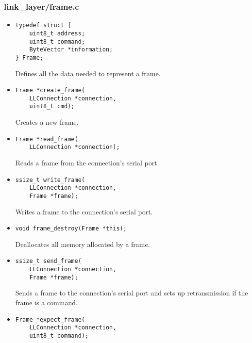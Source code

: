 \documentclass[11pt,a4paper,twocolumn]{article}
\begin{document}
\subsubsection{link\_layer/frame.c}

\begin{itemize}
    \item \begin{lstlisting}
typedef struct {
    uint8_t address;
    uint8_t command;
    ByteVector *information;
} Frame;
    \end{lstlisting}

          Defines all the data needed to represent a frame.

    \item \begin{lstlisting}
Frame *create_frame(
    LLConnection *connection, 
    uint8_t cmd);
    \end{lstlisting}

          Creates a new frame.

    \item \begin{lstlisting}
Frame *read_frame(
    LLConnection *connection);
    \end{lstlisting}

          Reads a frame from the connection's serial port.

    \item \begin{lstlisting}
ssize_t write_frame(
    LLConnection *connection, 
    Frame *frame);
    \end{lstlisting}

          Writes a frame to the connection's serial port.

    \item \begin{lstlisting}
void frame_destroy(Frame *this);
    \end{lstlisting}

          Deallocates all memory allocated by a frame.

    \item \begin{lstlisting}
ssize_t send_frame(
    LLConnection *connection, 
    Frame *frame);
    \end{lstlisting}

          Sends a frame to the connection's serial port and sets up retransmission if the frame is a command.

    \item \begin{lstlisting}
Frame *expect_frame(
    LLConnection *connection, 
    uint8_t command);
    \end{lstlisting}


\end{itemize}
\end{document}
